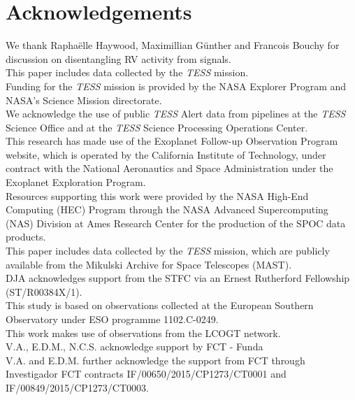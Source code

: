 \documentclass[fleqn,usenatbib]{mnras}
\newcommand{\tess}{{\it TESS}}
\begin{document}
\section*{Acknowledgements}
We thank Rapha{\"e}lle Haywood, Maximillian G{\"u}nther and Francois Bouchy for discussion on disentangling RV activity from signals.\\
This paper includes data collected by the \tess{} mission.\\
Funding for the \tess{} mission is provided by the NASA Explorer Program and NASA's Science Mission directorate. \\
We acknowledge the use of public \tess{} Alert data from pipelines at the \tess{} Science Office and at the \tess{} Science Processing Operations Center. \\
This research has made use of the Exoplanet Follow-up Observation Program website, which is operated by the California Institute of Technology, under contract with the National Aeronautics and Space Administration under the Exoplanet Exploration Program. \\
Resources supporting this work were provided by the NASA High-End Computing (HEC) Program through the NASA Advanced Supercomputing (NAS) Division at Ames Research Center for the production of the SPOC data products. \\
This paper includes data collected by the \tess{} mission, which are publicly available from the Mikulski Archive for Space Telescopes (MAST).\\
DJA acknowledges support from the STFC via an Ernest Rutherford Fellowship (ST/R00384X/1).\\ %
This study is based on observations collected at the European Southern Observatory under ESO programme 1102.C-0249.\\ %
This work makes use of observations from the LCOGT network.\\ %
V.A., E.D.M., N.C.S. acknowledge support by FCT - Funda\\ %
V.A. and E.D.M. further acknowledge the support from FCT through Investigador FCT contracts IF/00650/2015/CP1273/CT0001 and IF/00849/2015/CP1273/CT0003.\\ %
\end{document}
